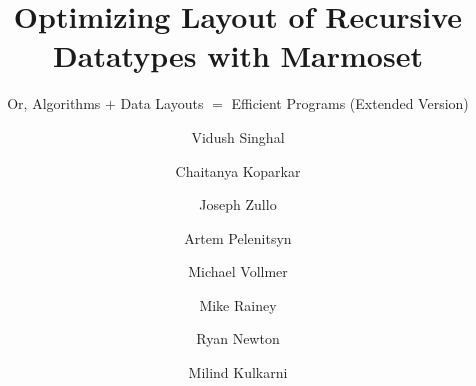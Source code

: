 \documentclass[a4paper,USenglish,cleveref, autoref, thm-restate, authorcolumns]{lipics-v2021}
\author{Vidush Singhal}{Purdue University, USA}
{singhav@purdue.edu}{https://orcid.org/0000-0001-6912-3840}
{}
\author{Chaitanya Koparkar}{Indiana University, USA}
{ckoparka@indiana.edu}{https://orcid.org/0000-0002-4515-8499}
{}
\author{Joseph Zullo}{Purdue University, USA}
{jzullo@purdue.edu}{https://orcid.org/0000-0002-3908-9853}
{}
\author{Artem Pelenitsyn}{Purdue University, USA}
{apelenit@purdue.edu}{https://orcid.org/0000-0001-8334-8106}
{}
\author{Michael Vollmer}{University of Kent, UK}
{M.Vollmer@kent.ac.uk}{https://orcid.org/0000-0002-0496-8268}
{}
\author{Mike Rainey}{Carnegie Mellon University, USA}
{me@mike-rainey.site}{https://orcid.org/0009-0002-9659-1636}
{}
\author{Ryan Newton}{Purdue University, USA}
{rrnewton@purdue.edu}{https://orcid.org/0000-0003-3934-9165}
{}
\author{Milind Kulkarni}{Purdue University, USA}
{milind@purdue.edu}{https://orcid.org/0000-0001-6827-345X}
{}
\begin{document}
\title{Optimizing Layout of Recursive Datatypes with Marmoset}


\subtitle{Or, Algorithms ${+}$ Data Layouts ${=}$ Efficient Programs (Extended Version)}

\maketitle






\end{document}

